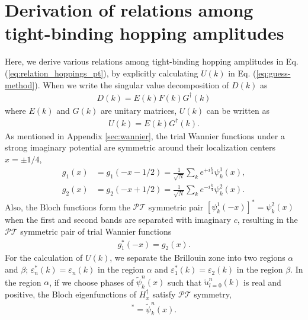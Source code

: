 \documentclass[prb,superscriptaddress,floatfix,twocolumn,showpacs]{revtex4-2}
\begin{document}
\section{Derivation of relations among tight-binding hopping amplitudes}
\label{sec:hopping}
Here, we derive various relations among tight-binding hopping amplitudes in Eq. (\ref{eq:relation_hoppings_pt}), by explicitly calculating $U(k)$ in Eq. (\ref{eq:guess-method}). 
When we write the singular value decomposition of $D(k)$ as
\begin{align}
    D(k)=E(k)F(k)G^\dagger(k)
    \label{eq:SVD_D}
\end{align}
where $E(k)$ and $G(k)$ are unitary matrices, $U(k)$ can be written as
\begin{align}
    U(k)=E(k)G^\dagger(k).
\end{align}
As mentioned in Appendix \ref{sec:wannier}, the trial Wannier functions under a strong imaginary potential are symmetric around their localization centers $x=\pm1/4$,
\begin{align}
    g_1(x)&=g_1(-x-1/2)=\frac{1}{\sqrt{N}}\sum_ke^{+i\frac{k}{4}}\psi_k^1(x),
    \label{eq:wannier-funcion_1}\\
    g_2(x)&=g_2(-x+1/2)=\frac{1}{\sqrt{N}}\sum_ke^{-i\frac{k}{4}}\psi_k^2(x). \label{eq:wannier-funcion_2}
\end{align}
Also, the Bloch functions form the $\mathcal{PT}$ symmetric pair $[\psi_k^1(-x)]^\ast=\psi_k^2(x)$ when the first and second bands are separated with imaginary $c$, resulting in the $\mathcal{PT}$ symmetric pair of trial Wannier functions
\begin{align}
    g_1^\ast(-x)=g_2(x).
    \label{eq:pt-pair_wannier-funcion}
\end{align}
For the calculation of $U(k)$, we separate the Brillouin zone into two regions $\alpha$ and $\beta$; $\varepsilon_n^\ast(k)=\varepsilon_n(k)$ in the region $\alpha$ and $\varepsilon_1^\ast(k)=\varepsilon_2(k)$ in the region $\beta$. 
In the region $\alpha$, if we choose phases of $\tilde{\psi}_k^n(x)$ such that $\tilde{u}_{l=0}^n(k)$ is real and positive, the Bloch eigenfunctions of $H_x^\dagger$ satisfy $\mathcal{PT}$ symmetry, 
\begin{align}
    [\tilde{\psi}_k^n(-x)]^\ast=\tilde{\psi}_k^n(x).
    \label{eq:pt-symmetric_alpha}
\end{align}
\end{document}
